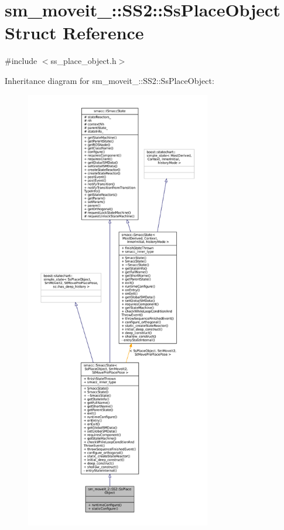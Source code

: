 \hypertarget{structsm__moveit__2_1_1SS2_1_1SsPlaceObject}{}\section{sm\+\_\+moveit\+\_\+:\+:S\+S2\+:\+:Ss\+Place\+Object Struct Reference}
\label{structsm__moveit__2_1_1SS2_1_1SsPlaceObject}


{\ttfamily \#include $<$ss\+\_\+place\+\_\+object.\+h$>$}



Inheritance diagram for sm\+\_\+moveit\+\_\+:\+:S\+S2\+:\+:Ss\+Place\+Object\+:
\nopagebreak
\begin{figure}[H]
\begin{center}
\leavevmode
\includegraphics[height=550pt]{structsm__moveit__2_1_1SS2_1_1SsPlaceObject__inherit__graph}
\end{center}
\end{figure}


